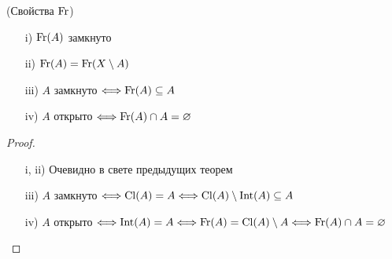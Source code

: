 \begin{theorem}(Свойства $\operatorname{Fr}$)
    \enewline
    \begin{itemize}
        \item[i)] $\operatorname{Fr}(A)$ замкнуто
        \item[ii)] $\operatorname{Fr}(A) = \operatorname{Fr}(X \setminus A)$
        \item[iii)] $A$ замкнуто $\Longleftrightarrow \operatorname{Fr}(A) \subseteq A$
        \item[iv)] $A$ открыто $\Longleftrightarrow \operatorname{Fr}(A) \cap A = \varnothing$
    \end{itemize}
\end{theorem}
\begin{proof}
    \enewline
    \begin{itemize}
        \item[i, ii)] Очевидно в свете предыдущих теорем
        \item[iii)] $A$ замкнуто $\Longleftrightarrow \operatorname{Cl}(A) = A \Longleftrightarrow \operatorname{Cl}(A) \setminus \operatorname{Int}(A)
        \subseteq A$
        \item[iv)] $A$ открыто $\Longleftrightarrow \operatorname{Int}(A) = A \Longleftrightarrow \operatorname{Fr}(A) = \operatorname{Cl}(A) \setminus
        A \Longleftrightarrow \operatorname{Fr}(A) \cap A = \varnothing$
    \end{itemize}
\end{proof}
